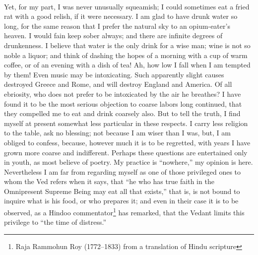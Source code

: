 \documentclass[letterpaper,12pt]{article}
\begin{document}
\paragraph{} Yet, for my part, I was never unusually squeamish; I could
sometimes eat a fried rat with a good relish, if it were necessary. I am glad to
have drunk water so long, for the same reason that I prefer the natural sky to
an opium-eater's heaven. I would fain keep sober always; and there are infinite
degrees of drunkenness. I believe that water is the only drink for a wise man;
wine is not so noble a liquor; and think of dashing the hopes of a morning with
a cup of warm coffee, or of an evening with a dish of tea! Ah, how low I fall
when I am tempted by them! Even music may be intoxicating. Such apparently
slight causes destroyed Greece and Rome, and will destroy England and America.
Of all ebriosity, who does not prefer to be intoxicated by the air he breathes?
I have found it to be the most serious objection to coarse labors long
continued, that they compelled me to eat and drink coarsely also. But to tell
the truth, I find myself at present somewhat less particular in these respects.
I carry less religion to the table, ask no blessing; not because I am wiser than
I was, but, I am obliged to confess, because, however much it is to be
regretted, with years I have grown more coarse and indifferent. Perhaps these
questions are entertained only in youth, as most believe of poetry. My practice
is \enquote{nowhere,} my opinion is here. Nevertheless I am far from regarding
myself as one of those privileged ones to whom the Ved refers when it says, that
\enquote{he who has true faith in the Omnipresent Supreme Being may eat all that
    exists,} that is, is not bound to inquire what is his food, or who prepares
it; and even in their case it is to be observed, as a Hindoo
commentator\footnote{Raja Rammohun Roy (1772--1833) from a translation of Hindu
    scripture} has remarked, that the Vedant limits this privilege to
\enquote{the time of distress.}
\end{document}
